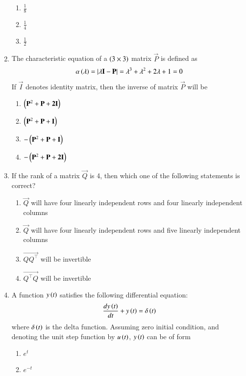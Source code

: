 \documentclass[journal]{IEEEtran}
\begin{document}
\begin{enumerate}
\begin{enumerate}
     \item $\frac{1}{8}$
     \item $\frac{1}{4}$
     \item $\frac{1}{2}$ \\
 \end{enumerate}
\item The characteristic equation of a $\left(3 \times 3\right)$ matrix $\vec{P}$ is defined as 
\begin{align*}
    \alpha\left(\lambda\right) = \left\vert\lambda\mathbf{I} - \mathbf{P}\right\vert = \lambda^3 + \lambda^2 + 2\lambda + 1 = 0
\end{align*}
If $\vec{I}$ denotes identity matrix, then the inverse of matrix $\vec{P}$ will be
\begin{enumerate}
    \item $\left(\mathbf{P}^2 + \mathbf{P} + \mathbf{2I}\right)$
    \item $\left(\mathbf{P}^2 + \mathbf{P} + \mathbf{I}\right)$
    \item $-\left(\mathbf{P}^2 + \mathbf{P} + \mathbf{I}\right)$
    \item $-\left(\mathbf{P}^2 + \mathbf{P} + \mathbf{2I}\right)$ \\
\end{enumerate}
\item If the rank of a  matrix $\vec{Q}$ is 4, then which one of the following statements is correct?
\begin{enumerate}
    \item $\vec{Q}$ will have four linearly independent rows and four linearly independent columns
    \item $\vec{Q}$ will have four linearly independent rows and five linearly independent columns
    \item $\vec{Q Q^\intercal}$ will be invertible
    \item $\vec{Q^\intercal Q}$ will be invertible \\
\end{enumerate}
\item A function $y\left(t\right)$ satisfies the following differential equation:
\begin{align*}
    \frac{dy\left(t\right)}{dt} + y\left(t\right) = \delta\left(t\right)
\end{align*}
where $\delta\left(t\right)$ is the delta function. Assuming zero initial condition, and denoting the unit step function by $u\left(t\right)$, $y\left(t\right)$ can be of form
\begin{enumerate}
    \item $e^t$
    \item $e^{-t}$

\end{enumerate}
\end{enumerate}
\end{document}
